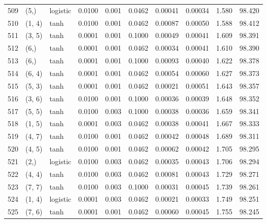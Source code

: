 \begin{tabular}{lllrrrrrrr}
509 &        (5,) &  logistic &  0.0100 &  0.001 &  0.0462 &          0.00041 &    0.00034 &       1.580 &    98.420 \\
510 &      (1, 4) &      tanh &  0.0100 &  0.001 &  0.0462 &          0.00087 &    0.00050 &       1.588 &    98.412 \\
511 &      (3, 5) &      tanh &  0.0001 &  0.001 &  0.1000 &          0.00049 &    0.00041 &       1.609 &    98.391 \\
512 &        (6,) &      tanh &  0.0001 &  0.001 &  0.0462 &          0.00034 &    0.00041 &       1.610 &    98.390 \\
513 &        (6,) &      tanh &  0.0001 &  0.001 &  0.1000 &          0.00093 &    0.00040 &       1.622 &    98.378 \\
514 &      (6, 4) &      tanh &  0.0001 &  0.001 &  0.0462 &          0.00054 &    0.00060 &       1.627 &    98.373 \\
515 &      (5, 3) &      tanh &  0.0001 &  0.001 &  0.0462 &          0.00021 &    0.00051 &       1.643 &    98.357 \\
516 &      (3, 6) &      tanh &  0.0100 &  0.001 &  0.1000 &          0.00036 &    0.00039 &       1.648 &    98.352 \\
517 &      (5, 5) &      tanh &  0.0100 &  0.003 &  0.1000 &          0.00038 &    0.00036 &       1.659 &    98.341 \\
518 &      (1, 5) &      tanh &  0.0001 &  0.003 &  0.0462 &          0.00038 &    0.00041 &       1.667 &    98.333 \\
519 &      (4, 7) &      tanh &  0.0100 &  0.001 &  0.0462 &          0.00042 &    0.00048 &       1.689 &    98.311 \\
520 &      (4, 5) &      tanh &  0.0100 &  0.001 &  0.0462 &          0.00062 &    0.00042 &       1.705 &    98.295 \\
521 &        (2,) &  logistic &  0.0100 &  0.003 &  0.0462 &          0.00035 &    0.00043 &       1.706 &    98.294 \\
522 &      (4, 4) &      tanh &  0.0100 &  0.003 &  0.0462 &          0.00081 &    0.00043 &       1.729 &    98.271 \\
523 &      (7, 7) &      tanh &  0.0100 &  0.003 &  0.1000 &          0.00031 &    0.00045 &       1.739 &    98.261 \\
524 &      (1, 4) &  logistic &  0.0001 &  0.003 &  0.0462 &          0.00021 &    0.00033 &       1.749 &    98.251 \\
525 &      (7, 6) &      tanh &  0.0001 &  0.001 &  0.0462 &          0.00060 &    0.00045 &       1.755 &    98.245 \\

\end{tabular}
